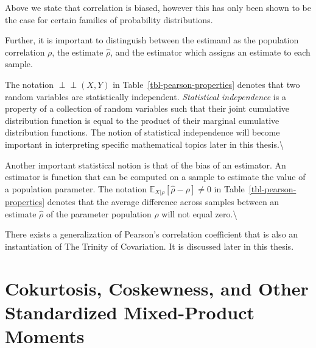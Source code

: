 \documentclass[
  letterpaper,
  DIV=11,
  numbers=noendperiod]{scrreprt}
\begin{document}
\begin{tcolorbox}[enhanced jigsaw, colframe=quarto-callout-caution-color-frame, toptitle=1mm, bottomtitle=1mm, breakable, colbacktitle=quarto-callout-caution-color!10!white, arc=.35mm, coltitle=black, opacitybacktitle=0.6, opacityback=0, leftrule=.75mm, titlerule=0mm, title=\textcolor{quarto-callout-caution-color}{\faFire}\hspace{0.5em}{Some Clarifications About Bias}, rightrule=.15mm, toprule=.15mm, colback=white, bottomrule=.15mm, left=2mm]

Above we state that correlation is biased, however this has only been
shown to be the case for certain families of probability distributions.

Further, it is important to distinguish between the estimand as the
population correlation \(\rho\), the estimate \(\hat \rho\), and the
estimator which assigns an estimate to each sample.

\end{tcolorbox}

The notation \(\perp\!\!\!\!\perp (X, Y)\) in
Table~\ref{tbl-pearson-properties} denotes that two random variables are
statistically independent. \emph{Statistical independence} is a property
of a collection of random variables such that their joint cumulative
distribution function is equal to the product of their marginal
cumulative distribution functions. The notion of statistical
independence will become important in interpreting specific mathematical
topics later in this thesis.\textbackslash{}

Another important statistical notion is that of the bias of an
estimator. An estimator is function that can be computed on a sample to
estimate the value of a population parameter. The notation
\(\mathbb{E}_{X|\rho}[\hat{\rho} - \rho] \neq 0\) in
Table~\ref{tbl-pearson-properties} denotes that the average difference
across samples between an estimate \(\hat{\rho}\) of the parameter
population \(\rho\) will not equal zero.\textbackslash{}

There exists a generalization of Pearson's correlation coefficient that
is also an instantiation of The Trinity of Covariation. It is discussed
later in this thesis.

\section{Cokurtosis, Coskewness, and Other Standardized Mixed-Product
Moments}\label{cokurtosis-coskewness-and-other-standardized-mixed-product-moments}
\end{document}
